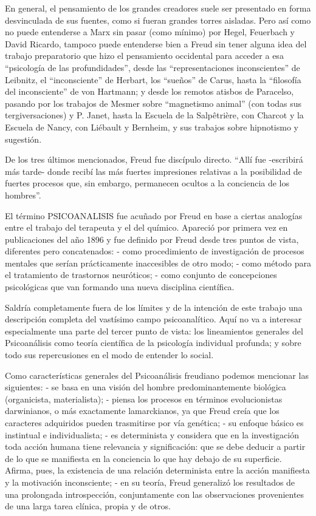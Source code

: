 \documentclass[
]{book}
\begin{document}
En general, el pensamiento de los grandes creadores suele ser presentado en forma desvinculada de sus fuentes, como si fueran grandes torres aisladas. Pero así como no puede entenderse a Marx sin pasar (como mínimo) por Hegel, Feuerbach y David Ricardo, tampoco puede entenderse bien a Freud sin tener alguna idea del trabajo preparatorio que hizo el pensamiento occidental para acceder a esa ``psicología de las profundidades'', desde las ``representaciones inconscientes'' de Leibnitz, el ``inconsciente'' de Herbart, los ``sueños'' de Carus, hasta la ``filosofía del inconsciente'' de von Hartmann; y desde los remotos atisbos de Paracelso, pasando por los trabajos de Mesmer sobre ``magnetismo animal'' (con todas sus tergiversaciones) y P. Janet, hasta la Escuela de la Salpêtrière, con Charcot y la Escuela de Nancy, con Liébault y Bernheim, y sus trabajos sobre hipnotismo y sugestión.

De los tres últimos mencionados, Freud fue discípulo directo. ``Allí fue -escribirá más tarde- donde recibí las más fuertes impresiones relativas a la posibilidad de fuertes procesos que, sin embargo, permanecen ocultos a la conciencia de los hombres''.

El término PSICOANALISIS fue acuñado por Freud en base a ciertas analogías entre el trabajo del terapeuta y el del químico. Apareció por primera vez en publicaciones del año 1896 y fue definido por Freud desde tres puntos de vista, diferentes pero concatenados: - como procedimiento de investigación de procesos mentales que serían prácticamente inaccesibles de otro modo; - como método para el tratamiento de trastornos neuróticos; - como conjunto de concepciones psicológicas que van formando una nueva disciplina científica.

Saldría completamente fuera de los límites y de la intención de este trabajo una descripción completa del vastísimo campo psicoanalítico. Aquí no va a interesar especialmente una parte del tercer punto de vista: los lineamientos generales del Psicoanálisis como teoría científica de la psicología individual profunda; y sobre todo sus repercusiones en el modo de entender lo social.

Como características generales del Psicoanálisis freudiano podemos mencionar las siguientes: - se basa en una visión del hombre predominantemente biológica (organicista, materialista); - piensa los procesos en términos evolucionistas darwinianos, o más exactamente lamarckianos, ya que Freud creía que los caracteres adquiridos pueden trasmitirse por vía genética; - su enfoque básico es instintual e individualista; - es determinista y considera que en la investigación toda acción humana tiene relevancia y significación: que se debe deducir a partir de lo que se manifiesta en la conciencia lo que hay debajo de su superficie. Afirma, pues, la existencia de una relación determinista entre la acción manifiesta y la motivación inconsciente; - en su teoría, Freud generalizó los resultados de una prolongada introspección, conjuntamente con las observaciones provenientes de una larga tarea clínica, propia y de otros.
\end{document}
